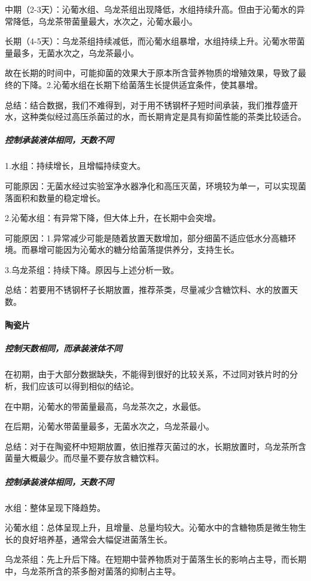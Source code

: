 \documentclass[12pt,a4paper]{article}
\begin{document}
中期（2-3天）：沁葡水组、乌龙茶组出现降低，水组持续升高。但由于沁葡水的异常降低，乌龙茶带菌量最大，水次之，沁葡水最小。

长期（4-5天）：乌龙茶组持续减低，而沁葡水组暴增，水组持续上升。沁葡水带菌量最多，无菌水次之，乌龙茶最小。



故在长期的时间中，可能抑菌的效果大于原本所含营养物质的增殖效果，导致了最终的下降。2.沁葡水组在长期下给菌落生长提供适宜条件，使其暴增。

总结：结合数据，我们不难得到，对于用不锈钢杯子短时间承装，我们推荐盛开水，这种类似经过高压杀菌过的水，而长期肯定是具有抑菌性能的茶类比较适合。

\subparagraph{控制承装液体相同，天数不同}

1.水组：持续增长，且增幅持续变大。

可能原因：无菌水经过实验室净水器净化和高压灭菌，环境较为单一，可以实现菌落面积和数量的稳定增长。

2.沁葡水组：有异常下降，但大体上升，在长期中会突增。

可能原因：1.异常减少可能是随着放置天数增加，部分细菌不适应低水分高糖环境。而暴增可能因为沁葡水的糖分给菌落提供养分，支持生长。

3.乌龙茶组：持续下降。原因与上述分析一致。

总结：若要用不锈钢杯子长期放置，推荐茶类，尽量减少含糖饮料、水的放置天数。

\paragraph{陶瓷片}
\subparagraph{控制天数相同，而承装液体不同}
 
在初期，由于大部分数据缺失，不能得到很好的比较关系，不过同对铁片时的分析，我们应该可以得到相似的结论。
 
在中期，沁葡水的带菌量最高，乌龙茶次之，水最低。


 
在后期，沁葡水带菌量最多，无菌水次之，乌龙茶最小。

总结：对于在陶瓷杯中短期放置，依旧推荐灭菌过的水，长期放置时，乌龙茶所含菌量大概最少。而尽量不要存放含糖饮料。
 
 
\subparagraph{控制承装液体相同，天数不同}
 
水组：整体呈现下降趋势。
 
沁葡水组：总体呈现上升，且增量、总量均较大。沁葡水中的含糖物质是微生物生长的良好培养基，通常会大幅促进菌落生长。
 
乌龙茶组：先上升后下降。在短期中营养物质对于菌落生长的影响占主导，而长期中，乌龙茶所含的茶多酚对菌落的抑制占主导。
 
\end{document}
